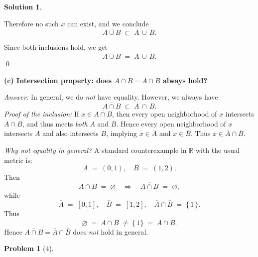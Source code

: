 \documentclass[12pt]{article}
\theoremstyle{definition} %
\newtheorem{solution}{Solution}
\newtheorem{problem}{Problem}
\theoremstyle{plain} %
\begin{document}
\begin{solution}
\begin{enumerate}
    Therefore no such $x$ can exist, and we conclude
    \[
    \overline{A \cup B} \;\subset\; \overline{A} \,\cup\, \overline{B}.
    \]
    \end{enumerate}
    
    Since both inclusions hold, we get
    \[
    \overline{A \cup B}
    \;=\;
    \overline{A} \,\cup\, \overline{B}.
    \]
    \qed
    
    \bigskip
    
    \noindent
    \textbf{(c) Intersection property: does $\overline{A \cap B} = \overline{A} \cap \overline{B}$ always hold?}
    
    \smallskip
    \noindent
    \emph{Answer:} In general, we do \emph{not} have equality. However, we always have
    \[
    \overline{A \cap B}
    \;\subset\;
    \overline{A} \,\cap\, \overline{B}.
    \]
    \emph{Proof of the inclusion:} If $x \in \overline{A \cap B}$, then every open neighborhood of $x$ intersects $A \cap B$, and thus meets \emph{both} $A$ and $B$. Hence every open neighborhood of $x$ intersects $A$ and also intersects $B$, implying $x \in \overline{A}$ and $x \in \overline{B}$. Thus $x \in \overline{A} \cap \overline{B}$.
    
    \smallskip
    \noindent
    \emph{Why not equality in general?} A standard counterexample in $\mathbb{R}$ with the usual metric is:
    \[
    A \;=\;(0,1), \quad B \;=\;(1,2).
    \]
    Then
    \[
    A \cap B \;=\;\varnothing \quad\Longrightarrow\quad
    \overline{A \cap B} \;=\;\varnothing,
    \]
    while
    \[
    \overline{A} \;=\;[0,1],
    \quad
    \overline{B} \;=\;[1,2],
    \quad
    \overline{A} \cap \overline{B} \;=\;\{\,1\,\}.
    \]
    Thus
    \[
    \varnothing \;=\;\overline{A \cap B}
    \;\neq\;
    \{\,1\}
    \;=\;
    \overline{A} \cap \overline{B}.
    \]
    Hence $\overline{A \cap B} = \overline{A} \cap \overline{B}$ does \emph{not} hold in general.     
\end{solution}
\begin{problem}[4]
    
\end{problem}
\end{document}
